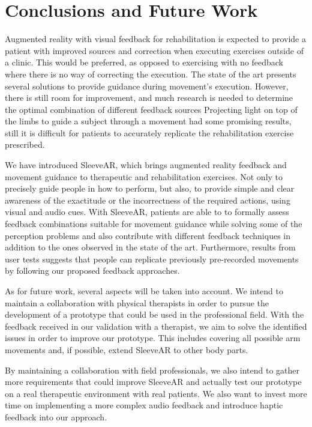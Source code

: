 \chapter{Conclusions and Future Work}
\label{sec:conclusions}


Augmented reality with visual feedback for rehabilitation is expected to provide a patient with improved sources and correction when executing exercises outside of a clinic. 
This would be preferred, as opposed to exercising with no feedback where there is no way of correcting the execution.
The state of the art presents several solutions to provide guidance during movement's execution.
However, there is still room for improvement, and much research is needed to determine the optimal combination of different feedback sources
Projecting light on top of the limbs to guide a subject through a movement had some promising results, still it is difficult for patients to accurately replicate the rehabilitation exercise prescribed.

We have introduced SleeveAR, which brings augmented reality feedback and movement guidance to therapeutic and rehabilitation exercises. Not only to precisely guide people in how to perform, but also, to provide simple and clear awareness of the exactitude or the incorrectness of the required actions, using visual and audio cues.
With SleeveAR, patients are able to to formally assess feedback combinations suitable for movement guidance while solving some of the perception problems and also contribute with different feedback techniques in addition to the ones observed in the state of the art.
Furthermore, results from user tests suggests that people can replicate previously pre-recorded movements by following our proposed feedback approaches.

As for future work, several aspects will be taken into account. We intend to maintain a collaboration with physical therapists in order to pursue the development of a prototype that could be used in the professional field.
With the feedback received in our validation with a therapist, we aim to solve the identified issues in order to improve our prototype. This includes covering all possible arm movements and, if possible, extend SleeveAR to other body parts.

By maintaining a collaboration with field professionals, we also intend to gather more requirements that could improve SleeveAR and actually test our prototype on a real therapeutic environment with real patients.
We also want to invest more time on implementing a more complex audio feedback and introduce haptic feedback into our approach.

